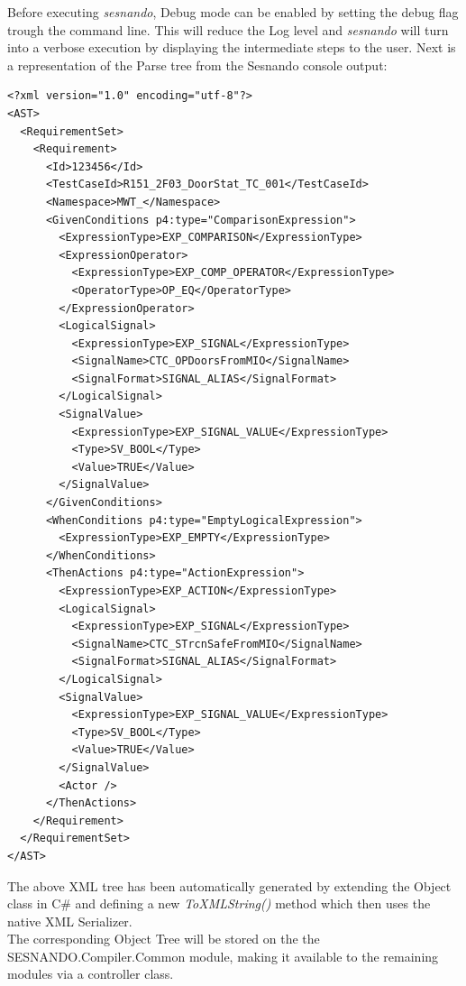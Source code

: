 Before executing \textit{sesnando}, Debug mode can be enabled by setting the debug flag trough the command line. This will reduce the Log level and \textit{sesnando} will turn into a verbose execution by displaying the intermediate steps to the user. Next is a representation of the Parse tree from the Sesnando console output: \\

\lstset{language=XML}
\begin{lstlisting}
<?xml version="1.0" encoding="utf-8"?>
<AST>
  <RequirementSet>
    <Requirement>
      <Id>123456</Id>
      <TestCaseId>R151_2F03_DoorStat_TC_001</TestCaseId>
      <Namespace>MWT_</Namespace>
      <GivenConditions p4:type="ComparisonExpression">
        <ExpressionType>EXP_COMPARISON</ExpressionType>
        <ExpressionOperator>
          <ExpressionType>EXP_COMP_OPERATOR</ExpressionType>
          <OperatorType>OP_EQ</OperatorType>
        </ExpressionOperator>
        <LogicalSignal>
          <ExpressionType>EXP_SIGNAL</ExpressionType>
          <SignalName>CTC_OPDoorsFromMIO</SignalName>
          <SignalFormat>SIGNAL_ALIAS</SignalFormat>
        </LogicalSignal>
        <SignalValue>
          <ExpressionType>EXP_SIGNAL_VALUE</ExpressionType>
          <Type>SV_BOOL</Type>
          <Value>TRUE</Value>
        </SignalValue>
      </GivenConditions>
      <WhenConditions p4:type="EmptyLogicalExpression">
        <ExpressionType>EXP_EMPTY</ExpressionType>
      </WhenConditions>
      <ThenActions p4:type="ActionExpression">
        <ExpressionType>EXP_ACTION</ExpressionType>
        <LogicalSignal>
          <ExpressionType>EXP_SIGNAL</ExpressionType>
          <SignalName>CTC_STrcnSafeFromMIO</SignalName>
          <SignalFormat>SIGNAL_ALIAS</SignalFormat>
        </LogicalSignal>
        <SignalValue>
          <ExpressionType>EXP_SIGNAL_VALUE</ExpressionType>
          <Type>SV_BOOL</Type>
          <Value>TRUE</Value>
        </SignalValue>
        <Actor />
      </ThenActions>
    </Requirement>
  </RequirementSet>
</AST>
\end{lstlisting}
\label{code:xml_output}

The above XML tree has been automatically generated by extending the Object class in C\# and defining a new \textit{ToXMLString()} method which then uses the native XML Serializer.\\
The corresponding Object Tree will be stored on the the SESNANDO.Compiler.Common module, making it available to the remaining modules via a controller class.


